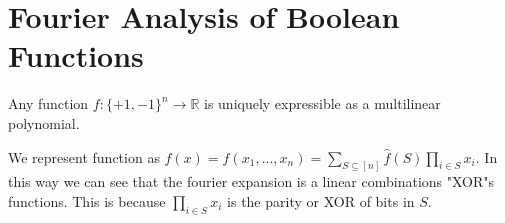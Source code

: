 \section{Fourier Analysis of Boolean Functions}

\begin{theorem}
    Any function $f:\{+1,-1\}^{n} \rightarrow \mathbb{R}$ is uniquely expressible as a multilinear polynomial.
\end{theorem}

We represent function as $f(x) = f(x_1,...,x_n)= \sum_{S \subseteq [n]} \hat{f}(S) \prod_{i \in S} x_i.$
In this way we can see that the fourier expansion is a linear combinations "XOR"s functions. This is 
because $\prod_{i \in S} x_i$ is the parity or XOR of bits in $S$.
